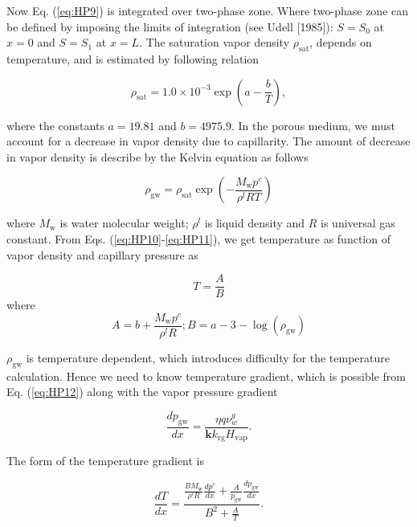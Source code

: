 Now Eq. (\ref{eq:HP9}) is integrated over two-phase zone. Where two-phase zone can be defined by imposing the limits of integration (see Udell [1985]): $S=S_0$ at $x=0$ and $S=S_1$ at $x=L$. The saturation vapor density $\rho_{\mathrm {sat}}$, depends on temperature, and is estimated by following relation

\begin{equation}
\rho_{\mathrm {sat}}=1.0\times10^{-3}\exp\left(a-\frac{b}{T}\right),
\label{eq:HP10}
\end{equation}

where the constants $a=19.81$ and $b=4975.9$. In the porous medium, we must account for a decrease in vapor density due to capillarity. The amount of decrease in vapor density is describe by the Kelvin equation as follows

\begin{equation}
\rho_{\mathrm {gw}}=\rho_{\mathrm {sat}}\exp\left(-\frac{M_{\mathrm w} p^c}{\rho^l RT}\right)
\label{eq:HP11}
\end{equation}

where $M_{\mathrm w}$ is water molecular weight; $\rho^l$ is liquid density and $R$ is universal gas constant. From Eqs. (\ref{eq:HP10}-\ref{eq:HP11}), we get temperature as function of vapor density and capillary pressure as

\begin{equation}
T=\frac{A}{B}
\label{eq:HP12}
\end{equation}
where
\begin{equation*}
 A=b+\frac{M_{\mathrm w} p^c}{\rho^l R}; B=a-3 -\log\left(\rho_{\mathrm {gw}}\right)
 \label{eq:HP20}
\end{equation*}

$\rho_{\mathrm {gw}}$ is temperature dependent, which introduces difficulty for the temperature calculation. Hence we need to know temperature gradient, which is possible from Eq. (\ref{eq:HP12}) along with the vapor pressure gradient

\begin{equation}
\frac{d p_{\mathrm{gw}}}{d x} = \frac{\eta q \nu^g_w}{\mathbf k k_{\mathrm {rg}} H_{\mathrm {vap}}}.
\label{eq:HP18}
\end{equation}

The form of the temperature gradient is

\begin{equation}
\frac{d T}{d x}=\frac{\frac{B M_{\mathrm w}}{\rho^l R} \frac{d p^c}{d x} + \frac{A}{p_{\mathrm{gw}}} \frac{d p_{\mathrm{gw}}}{d x}}{B^2+\frac{A}{T}}.
\label{eq:HP13}
\end{equation}


